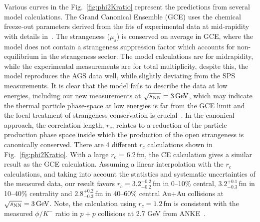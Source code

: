 \documentclass[%
 reprint,	
showpacs,
 amsmath,amssymb,
 aps,
 prc,
]{revtex4-1}
\begin{document}
Various curves in the Fig.~\ref{fig:phi2Kratio} represent the predictions from several model calculations. The Grand Canonical Ensemble (GCE) uses the chemical freeze-out parameters derived from the fits of experimental data at mid-rapidity with details in~\cite{ANDRONIC2006167_SHM}. The strangeness ($\mu_s$) is conserved on average in GCE, where the model does not contain a strangeness suppression factor which accounts for non-equilibrium in the strangeness sector. The model calculations are for midrapidity, while the experimental measurements are for total multiplicity, despite this, the model reproduces the AGS data well, while slightly deviating from the SPS measurements. It is clear that the model fails to describe the data at low energies, including our new measurements at ${\sqrt{s_{\rm NN}} = \rm{3\,GeV}}$, which may indicate the thermal particle phase-space at low energies is far from the GCE limit and the local treatment of strangeness conservation is crucial~\cite{BraunMunzinger:2003zd,Redlich_CE}. In the canonical approach, the correlation length, $r_c$, relates to a reduction of the particle production phase space inside which the production of the open strangeness is canonically conserved. There are 4 different $r_c$ calculations shown in Fig.~\ref{fig:phi2Kratio}. With a large $r_c$ = 6.2\,fm, the CE calculation gives a similar result as the GCE calculation. Assuming a linear interpolation with the $r_c$ calculations, and taking into account the statistics and systematic uncertainties of the measured data, our result favors $r_c = 3.2_{-0.2}^{+0.2}$\,fm in 0--10\% central, $3.2_{-0.3}^{+0.1}$\,fm in 10--40\% centrality and $2.8_{-0.3}^{+0.2}$\,fm in 40--60\% central Au+Au collisions at ${\sqrt{s_{\rm NN}} = \rm{3\,GeV}}$. Note, the calculation using $r_c = 1.2$\,fm is consistent with the measured $\phi/K^-$ ratio in $p+p$ collisions at 2.7 GeV from ANKE~\cite{ANKE_phi,HADES_phi_ArKCl}. 
\end{document}
